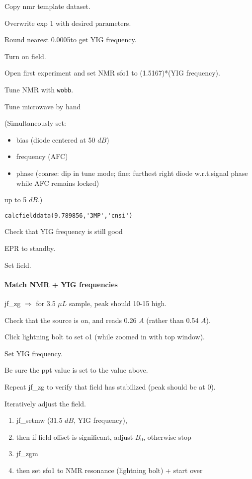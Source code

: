 Copy nmr template dataset.

Overwrite exp 1 with desired parameters.

Round nearest 0.0005\GHz to get YIG frequency.

Turn on field.

Open first experiment and set NMR sfo1 to (1.5167)*(YIG frequency).

Tune NMR with {\tt wobb}.

Tune microwave by hand
{\small (Simultaneously set:
\begin{itemize}
    \item bias (diode centered at 50 $dB$)
    \item frequency (AFC)
    \item phase (coarse: dip in tune mode; fine: furthest right diode w.r.t.signal phase while AFC remains locked)
\end{itemize}
up to 5 $dB$.)}
\begin{lstlisting}
calcfielddata(9.789856,'3MP','cnsi')
\end{lstlisting}


Check that YIG frequency is still good

EPR to standby.

Set field.

\paragraph{ Match NMR + YIG frequencies}
jf\_zg $\Rightarrow$ for 3.5 $\mu L$ sample, peak should 10-15 high.

Check that the source is on, and reads 0.26 $A$ (rather than 0.54 $A$).

Click lightning bolt to set o1 (while zoomed in with top window).

Set YIG frequency.

Be sure the ppt value is set to the value above.

Repeat jf\_zg to verify that field has stabilized (peak should be at 0).

Iteratively adjust the field.
{\small
\begin{enumerate}
	\item jf\_setmw (31.5 $dB$, YIG frequency),
	\item then if field offset is significant, adjust $B_0$, otherwise stop
	\item jf\_zgm
	\item then set sfo1 to NMR resonance (lightning bolt) + start over
\end{enumerate}
}


